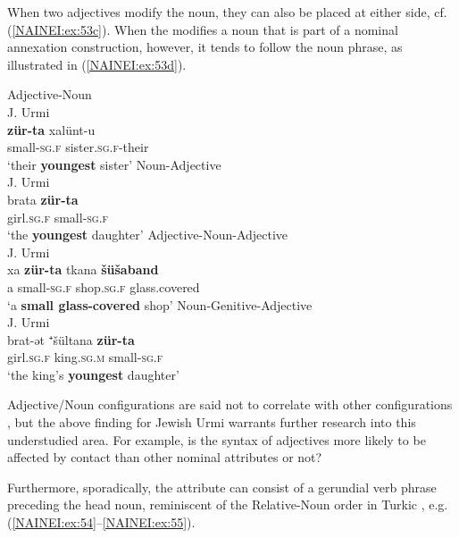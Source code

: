 \documentclass[output=paper,colorlinks,citecolor=brown,draftmode]{langscibook}
\begin{document}
When two adjectives modify the noun, they can also be placed at either side, cf. (\ref{NAINEI:ex:53c}). When the  modifies a noun that is part of a nominal annexation construction, however, it tends to follow the noun phrase, as illustrated in (\ref{NAINEI:ex:53d}).

\ea
\ea\label{NAINEI:ex:53a}
Adjective-Noun\\
J. Urmi \citep[83]{Garbell1065a} \\
\gll \textbf{zür-ta} xalünt-u \\
     small\textsc{-sg.f} sister\textsc{.sg.f-}their \\
\glt `their \textbf{youngest} sister'
\ex\label{NAINEI:ex:53b}
Noun-Adjective\\
J. Urmi \citep[172]{Garbell1065a} \\
\gll brata \textbf{zür-ta} \\
    girl\textsc{.sg.f} small\textsc{-sg.f} \\
\glt `the \textbf{youngest} daughter'
\ex\label{NAINEI:ex:53c}
Adjective-Noun-Adjective\\
J. Urmi \citep[192]{Garbell1065a} \\
\gll xa \textbf{zür-ta} tkana \textbf{šüšaband} \\
    a small\textsc{-sg.f} shop\textsc{.sg.f} glass.covered \\
\glt `a \textbf{small glass-covered} shop'
\ex\label{NAINEI:ex:53d}
Noun-Genitive-Adjective\\
J. Urmi \citep[86]{Garbell1065a} \\
\gll brat-ət ⁺šültana \textbf{zür-ta} \\
    girl\textsc{.sg.f} king\textsc{.sg.m} small\textsc{-sg.f} \\
\glt `the king's \textbf{youngest} daughter'
\z
\z

Adjective/Noun configurations are said not to correlate with other configurations \parencite[e.g.][95--96]{Dryer1992Greeburg}, but the above finding for Jewish Urmi warrants further research into this understudied area. For example, is the syntax of adjectives more likely to be affected by contact than other nominal attributes or not?

Furthermore, sporadically, the attribute can consist of a gerundial verb phrase preceding the head noun, reminiscent of the Relative-Noun order in Turkic \parencite[173]{Garbell1965b}, e.g. (\ref{NAINEI:ex:54}--\ref{NAINEI:ex:55}). 
\end{document}
